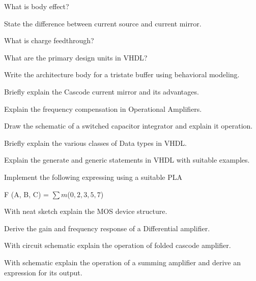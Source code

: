 \partA


\iitem What is body effect?

\item State the difference between current source and current mirror.

\item What is charge feedthrough?

\item What are the primary design units in VHDL?

\item Write the architecture body for a tristate buffer using behavioral modeling.


\markA
\partB

\item Briefly explain the Cascode current mirror and its advantages.

\item Explain the frequency compensation in Operational Amplifiers.

\item Draw the schematic of a switched capacitor integrator and explain it operation.

\item Briefly explain the various classes of Data types in VHDL.

\item Explain the generate and generic statements in VHDL with suitable examples.

\item Implement the following expressing using a suitable PLA
      
\hspace{2cm}  F (A, B, C) = $\sum m$($0, 2, 3, 5, 7$)

\markC
\partC

\item \iitem With neat sketch explain the MOS device structure.

\Or

\newpage \again

\item Derive the gain and frequency response of a Differential amplifier.

\ene

\item \iitem With circuit schematic explain the operation of folded cascode amplifier.

\Or

\item \iitem With schematic explain the operation of a summing amplifier and derive an
  expression for its output.

